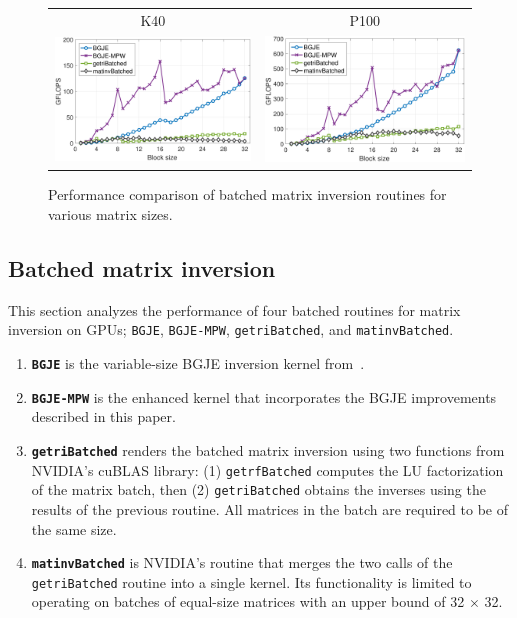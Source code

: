 \begin{figure}
\begin{center}
{\scriptsize
\begin{tabular}{cc}
K40 & P100\\
\includegraphics[width=.46\columnwidth]{plots/gje_bs_n_d_K40.pdf}
&
\includegraphics[width=.46\columnwidth]{plots/gje_bs_n_d_P100.pdf}
\end{tabular}
}
\end{center}
\caption{%
Performance comparison of batched matrix inversion routines
    for various matrix sizes.}
\label{2017-gje-block-jacobi:fig:bgje-mpw-fixed-batch}
\end{figure}

\subsection{Batched matrix inversion}

This section analyzes the performance of four batched routines for matrix
inversion on GPUs; {\tt BGJE}, {\tt BGJE-MPW}, {\tt getriBatched}, and {\tt matinvBatched}.
\begin{enumerate}
\item
\textbf{\tt BGJE} is the variable-size BGJE inversion kernel from~\cite{Anzt:2017:BGE:3026937.3026940}.
\item
\textbf{\tt BGJE-MPW} is the enhanced kernel that
       incorporates the BGJE improvements described in this paper.
\item
\textbf{\tt getriBatched} renders the batched matrix inversion using two
functions from NVIDIA's cuBLAS library: (1) \texttt{\tt getrfBatched} computes
the LU factorization of the matrix batch, then (2) \texttt{\tt getriBatched}
obtains the inverses using the results of the previous routine. All matrices in
the batch are required to be of the same size.
\item
\textbf{\tt matinvBatched} is NVIDIA's
routine that merges the two calls of the {\tt getriBatched} routine into
a single kernel. Its functionality is limited to operating on batches of
equal-size matrices with an upper bound of 32 $\times$ 32.
\end{enumerate}

